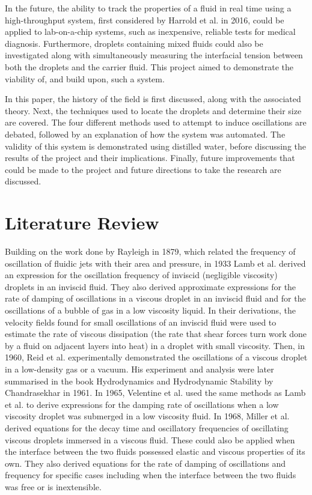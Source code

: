 \documentclass{physics_article_B}
\begin{document}
    In the future, the ability to track the properties of a fluid in real time using a high-throughput system, first considered by Harrold et al. in 2016\cite{harrold}, could be applied to lab-on-a-chip systems, such as inexpensive, reliable tests\cite{yager} for medical diagnosis. Furthermore, droplets containing mixed fluids could also be investigated along with simultaneously measuring the interfacial tension between both the droplets and the carrier fluid\cite{Backholm2017}. This project aimed to demonstrate the viability of, and build upon, such a system.
    
    In this paper, the history of the field is first discussed, along with the associated theory. Next, the techniques used to locate the droplets and determine their size are covered. The four different methods used to attempt to induce oscillations are debated, followed by an explanation of how the system was automated. The validity of this system is demonstrated using distilled water, before discussing the results of the project and their implications. Finally, future improvements that could be made to the project and future directions to take the research are discussed.

\newpage\section{Literature Review\label{sect:lit}}

    Building on the work done by Rayleigh in 1879, which related the frequency of oscillation of fluidic jets with their area and pressure\cite{rayleigh}, in 1933 Lamb et al.\cite{lamb} derived an expression for the oscillation frequency of inviscid (negligible viscosity) droplets in an inviscid fluid. They also derived approximate expressions for the rate of damping of oscillations in a viscous droplet in an inviscid fluid and for the oscillations of a bubble of gas in a low viscosity liquid. In their derivations, the velocity fields found for small oscillations of an inviscid fluid were used to estimate the rate of viscous dissipation (the rate that shear forces turn work done by a fluid on adjacent layers into heat) in a droplet with small viscosity\cite{lamb}. Then, in 1960, Reid et al. experimentally demonstrated the oscillations of a viscous droplet in a low-density gas or a vacuum\cite{reid}. His experiment and analysis were later summarised in the book Hydrodynamics and Hydrodynamic Stability by Chandrasekhar in 1961\cite{chandrasekhar}. In 1965, Velentine et al. used the same methods as Lamb et al. to derive expressions for the damping rate of oscillations when a low viscosity droplet was submerged in a low viscosity fluid\cite{velentine}. In 1968, Miller et al.\cite{miller} derived equations for the decay time and oscillatory frequencies of oscillating viscous droplets immersed in a viscous fluid. These could also be applied when the interface between the two fluids possessed elastic and viscous properties of its own. They also derived equations for the rate of damping of oscillations and frequency for specific cases including when the interface between the two fluids was free or is inextensible.
    
\end{document}
